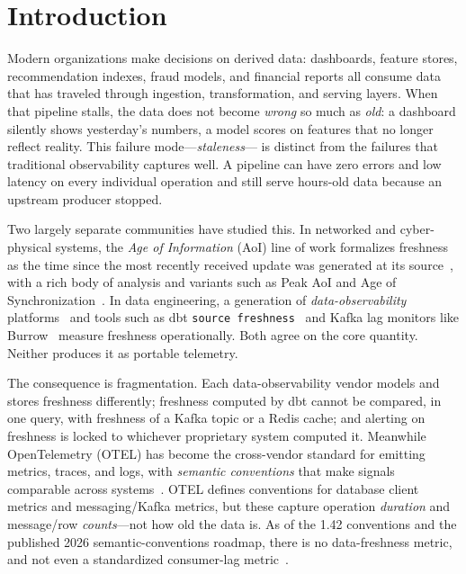\documentclass[11pt]{article}
\begin{document}
\section{Introduction}
Modern organizations make decisions on derived data: dashboards, feature
stores, recommendation indexes, fraud models, and financial reports all consume
data that has traveled through ingestion, transformation, and serving layers.
When that pipeline stalls, the data does not become \emph{wrong} so much as
\emph{old}: a dashboard silently shows yesterday's numbers, a model scores on
features that no longer reflect reality. This failure mode---\emph{staleness}---
is distinct from the failures that traditional observability captures well.
A pipeline can have zero errors and low latency on every individual operation
and still serve hours-old data because an upstream producer stopped.

Two largely separate communities have studied this. In networked and
cyber-physical systems, the \emph{Age of Information} (AoI) line of work
formalizes freshness as the time since the most recently received update was
generated at its source~\cite{kaul2012,yates2021survey}, with a rich body of
analysis and variants such as Peak AoI and Age of
Synchronization~\cite{yates2021survey}. In data engineering, a generation of
\emph{data-observability} platforms~\cite{montecarlo,metaplane,sifflet} and
tools such as dbt \texttt{source freshness}~\cite{dbtfreshness} and Kafka lag
monitors like Burrow~\cite{burrow} measure freshness operationally. Both agree
on the core quantity. Neither produces it as portable telemetry.

The consequence is fragmentation. Each data-observability vendor models and
stores freshness differently; freshness computed by dbt cannot be compared,
in one query, with freshness of a Kafka topic or a Redis cache; and alerting on
freshness is locked to whichever proprietary system computed it. Meanwhile
OpenTelemetry (OTEL) has become the cross-vendor standard for emitting metrics,
traces, and logs, with \emph{semantic conventions} that make signals
comparable across systems~\cite{otelsemconv}. OTEL defines conventions for
database client metrics and messaging/Kafka metrics, but these capture
operation \emph{duration} and message/row \emph{counts}---not how old the data
is. As of the 1.42 conventions and the published 2026 semantic-conventions
roadmap, there is no data-freshness metric, and not even a standardized
consumer-lag metric~\cite{otelmessaging,otelroadmap}.
\end{document}
